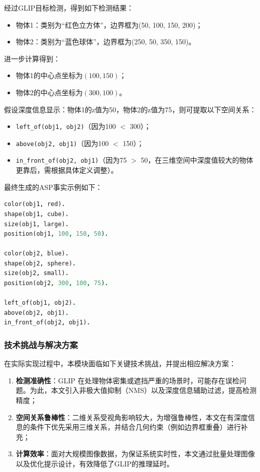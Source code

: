 经过GLIP目标检测，得到如下检测结果： 
\begin{itemize}[itemsep=0pt,parsep=0pt] 
    \item 物体1：类别为“红色立方体”，边界框为(50, 100, 150, 200)； 
    \item 物体2：类别为“蓝色球体”，边界框为(250, 50, 350, 150)。 
\end{itemize}

进一步计算得到： 
\begin{itemize}[itemsep=0pt,parsep=0pt] 
    \item 物体1的中心点坐标为$(100,150)$； 
    \item 物体2的中心点坐标为$(300,100)$。 
\end{itemize}

假设深度信息显示：物体1的z值为50，物体2的z值为75，则可提取以下空间关系： 
\begin{itemize}[itemsep=0pt,parsep=0pt] 
    \item \texttt{left\_of(obj1, obj2)}（因为100 $<$ 300）； 
    \item \texttt{above(obj2, obj1)}（因为100 $<$ 150）； 
    \item \texttt{in\_front\_of(obj2, obj1)}（因为75 $>$ 50，在三维空间中深度值较大的物体更靠后，需根据具体定义调整）。 
\end{itemize}

最终生成的ASP事实示例如下： 
\begin{lstlisting}[language=Prolog] 
color(obj1, red). 
shape(obj1, cube). 
size(obj1, large). 
position(obj1, 100, 150, 50).

color(obj2, blue). 
shape(obj2, sphere). 
size(obj2, small). 
position(obj2, 300, 100, 75).

left_of(obj1, obj2). 
above(obj2, obj1). 
in_front_of(obj2, obj1). 
\end{lstlisting}
\subsubsection{技术挑战与解决方案}
在实际实现过程中，本模块面临如下关键技术挑战，并提出相应解决方案： 
\begin{enumerate}[nosep] 
    \item \textbf{检测准确性}：GLIP 在处理物体密集或遮挡严重的场景时，可能存在误检问题。为此，本文引入非极大值抑制（NMS）以及深度信息辅助过滤，提高检测精度； 
    \item \textbf{空间关系鲁棒性}：二维关系受视角影响较大，为增强鲁棒性，本文在有深度信息的条件下优先采用三维关系，并结合几何约束（例如边界框重叠）进行补充； 
    \item \textbf{计算效率}：面对大规模图像数据，为保证系统实时性，本文通过批量处理图像以及优化提示设计，有效降低了GLIP的推理延时。
\end{enumerate}
